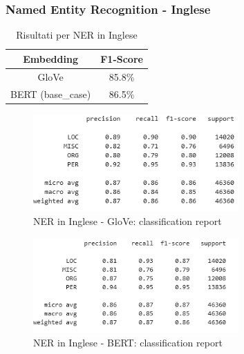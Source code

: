 \clearpage
\subsubsection{Named Entity Recognition - Inglese}
\begin{table}[ht!]
    \centering

    \begin{tabular}{|c|c|}
      \hline
        Embedding & F1-Score \\
      \hline
          GloVe  &   85.8\% \\
      \hline
          BERT (base\_case)   &   86.5\% \\
      \hline
    \end{tabular}
    \caption{Risultati per NER in Inglese}
    \label{tab:ner_eng_results}
\end{table}
\begin{figure}[hbt!]
    \centering
    \includegraphics[width=0.7\textwidth]{img/results/creport_ner_eng_glove.png}
    \caption{NER in Inglese - GloVe: classification report}
    \label{fig:creport_ner_eng_glove}
\end{figure}
\begin{figure}[ht!]
    \centering
    \includegraphics[width=0.7\textwidth]{img/results/creport_ner_eng_bert.png}
    \caption{NER in Inglese - BERT: classification report}
    \label{fig:creport_ner_eng_bert}
\end{figure}

\clearpage
